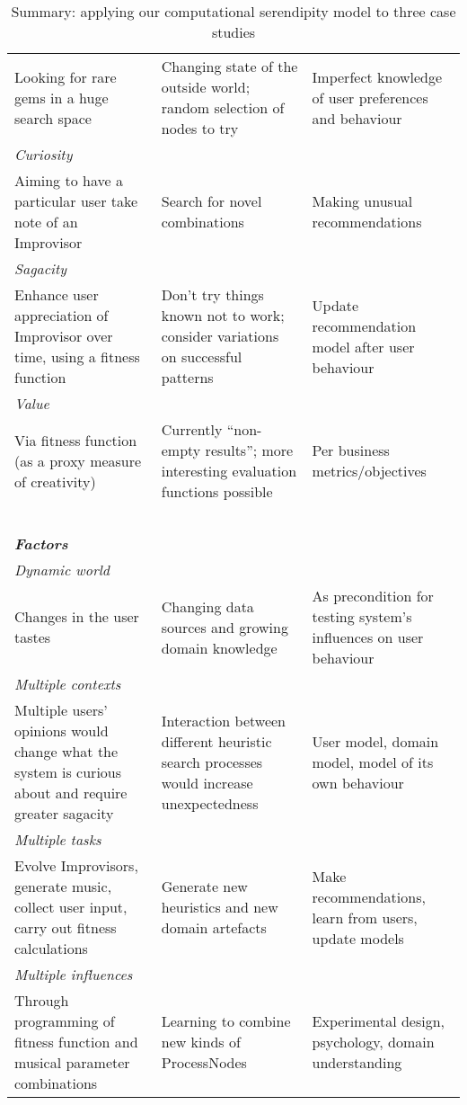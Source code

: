 \begin{table}[p]
{\begin{tabular}{p{1.4in}@{\hspace{.1in}}p{1.4in}@{\hspace{.1in}}p{1.4in}}
Looking for rare gems in a huge search space
& Changing state of the outside world; random selection of nodes to try
& Imperfect knowledge of user preferences and behaviour\\
\multicolumn{3}{l}{\em Curiosity} \\[-.1cm]
Aiming to have a particular user take note of an Improvisor
& Search for novel combinations
& Making unusual recommendations\\
\multicolumn{3}{l}{\em Sagacity} \\[-.1cm]
Enhance user appreciation of Improvisor over time, using a fitness function
& Don't try things known not to work; consider variations on successful patterns
& Update recommendation model after user behaviour \\
\multicolumn{3}{l}{\em Value} \\[-.1cm]
Via fitness function (as a proxy measure of creativity)
& Currently ``non-empty results''; more interesting evaluation functions possible
& Per business metrics/objectives\\
\cline{1-3}
~\\[-.1cm]
\multicolumn{3}{l}{\em \textbf{Factors}} \\
\cline{1-3}
\multicolumn{3}{l}{\em Dynamic world} \\[-.1cm]
Changes in the user tastes
& Changing data sources and growing domain knowledge
& As precondition for testing system's influences on user behaviour\\
\multicolumn{3}{l}{\em Multiple contexts} \\[-.1cm]
Multiple users' opinions would change what the system is curious about and require greater sagacity
& Interaction between different heuristic search processes would increase unexpectedness
& User model, domain model, model of its own behaviour\\
\multicolumn{3}{l}{\em Multiple tasks} \\[-.1cm]
Evolve Improvisors, generate music, collect user input, carry out fitness calculations
& Generate new heuristics and new domain artefacts
& Make recommendations, learn from users, update models\\
\multicolumn{3}{l}{\em Multiple influences} \\[-.1cm]
Through programming of fitness function and musical parameter combinations
& Learning to combine new kinds of ProcessNodes
& Experimental design, psychology, domain understanding\\
\cline{1-3}
\end{tabular}
\par}
\normalsize
\caption{Summary: applying our computational serendipity model to three case studies\label{caseStudies}}
\end{table}
\fi

